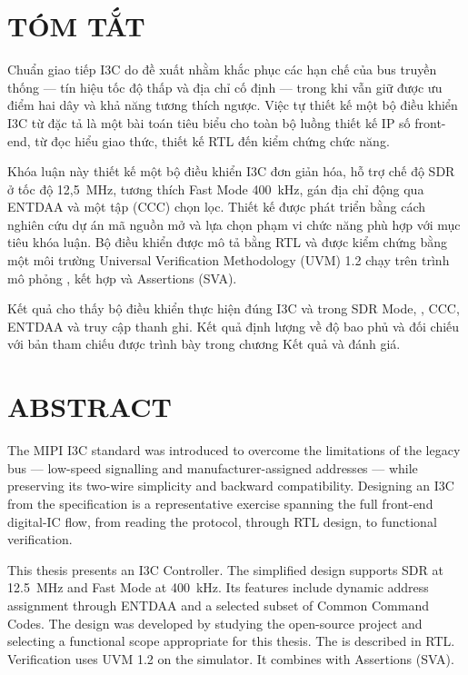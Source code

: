 \chapter*{TÓM TẮT}

Chuẩn giao tiếp I3C do \MIPIAlliance{} đề xuất nhằm khắc phục các hạn chế của bus \iic{}
truyền thống — tín hiệu \OpenDrain{} tốc độ thấp và địa chỉ cố định — trong khi
vẫn giữ được ưu điểm hai dây và khả năng tương thích ngược. Việc tự thiết kế một bộ điều khiển I3C từ
đặc tả là một bài toán tiêu biểu cho toàn bộ luồng thiết kế IP số front-end, từ đọc hiểu giao thức,
thiết kế RTL đến kiểm chứng chức năng.

Khóa luận này thiết kế một bộ điều khiển I3C \Controller{} đơn giản hóa, hỗ trợ chế độ SDR ở tốc độ
12,5~MHz, tương thích \iic{} Fast Mode 400~kHz, gán địa chỉ động qua ENTDAA và một tập
\CommonCommandCode{} (CCC) chọn lọc. Thiết kế được phát triển bằng cách nghiên cứu dự án mã nguồn mở
\CHIPSAlliance{} \IThreeCCore{} và lựa chọn phạm vi chức năng phù hợp với mục tiêu khóa luận. Bộ điều khiển
được mô tả bằng \SystemVerilog{} RTL và được kiểm chứng
bằng một môi trường Universal Verification Methodology (UVM) 1.2 chạy trên trình mô phỏng \CadenceXcelium{},
kết hợp \FunctionalCoverage{} và \SystemVerilog{} Assertions (SVA).

Kết quả cho thấy bộ điều khiển thực hiện đúng I3C \PrivateWrite{} và \PrivateRead{} trong SDR Mode,
\ImmediateDataTransfer{}, CCC, ENTDAA và truy cập thanh ghi. Kết quả định lượng về độ bao phủ và
đối chiếu với bản tham chiếu được trình bày trong chương Kết quả và đánh giá.


\clearpage

\chapter*{ABSTRACT}

The MIPI I3C standard was introduced to overcome the limitations of the legacy \iic{} bus —
low-speed \OpenDrain{} signalling and manufacturer-assigned addresses — while
preserving its two-wire simplicity and backward compatibility. Designing an I3C \Controller{} from the
specification is a representative exercise spanning the full front-end digital-IC flow, from reading the
protocol, through RTL design, to functional verification.

This thesis presents an I3C Controller. The simplified design supports SDR at 12.5~MHz
and \iic{} Fast Mode at 400~kHz. Its features include dynamic address
assignment through ENTDAA and a selected subset of Common Command Codes. The design was developed by studying the
open-source \CHIPSAlliance{} \IThreeCCore{} project and selecting a functional scope appropriate for this thesis.
The \Controller{} is described in \SystemVerilog{} RTL.
Verification uses UVM 1.2 on the \CadenceXcelium{} simulator. It combines
\FunctionalCoverage{} with \SystemVerilog{} Assertions (SVA).

